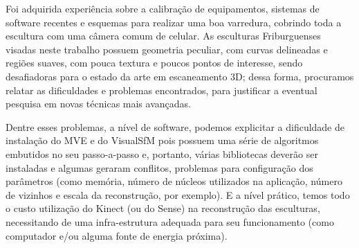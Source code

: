 Foi adquirida experiência sobre a calibração de equipamentos, sistemas
de software recentes e esquemas para realizar uma boa varredura, cobrindo toda a
escultura com uma câmera comum de celular.  As esculturas Friburguenses visadas neste trabalho
possuem geometria peculiar, com curvas delineadas e regiões suaves, com pouca
textura e poucos pontos de interesse, sendo desafiadoras para o estado da arte
em escaneamento 3D; dessa forma, procuramos relatar as dificuldades e problemas
encontrados, para justificar a eventual pesquisa em novas técnicas mais
avançadas. 

Dentre esses problemas, a nível de software, podemos explicitar a dificuldade de instalação do MVE e do VisualSfM pois possuem uma série de algoritmos embutidos no seu passo-a-passo e, portanto, várias bibliotecas deverão ser instaladas e algumas geraram conflitos, problemas para configuração dos parâmetros (como memória, número de núcleos utilizados na aplicação, número de vizinhos e escala da reconstrução, por exemplo). E a nível prático, temos todo o custo utilização do Kinect (ou do Sense) na reconstrução das esculturas, necessitando de uma infra-estrutura adequada para seu funcionamento (como computador e/ou alguma fonte de energia próxima).

